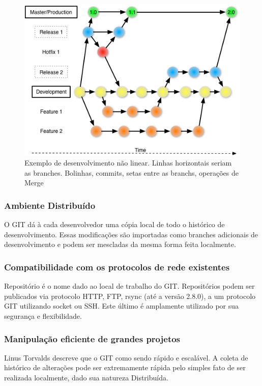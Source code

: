 \documentclass[
	article,			%
	12pt,				%
	oneside,			%
	a4paper,			%
	english,			%
	brazil,				%
	sumario=tradicional
	]{abntex2}
\begin{document}
\begin{figure}[!h]
\centering
\includegraphics[scale=0.5]{images/git_workflow.png}
\caption{Exemplo de desenvolvimento não linear. Linhas horizontais seriam as branches. Bolinhas, commits, setas entre as branchs, operações de Merge}
\label{img_git_workflow}
\end{figure}

\subsubsection{Ambiente Distribuído}

O GIT dá à cada desenvolvedor uma cópia local de todo o histórico de desenvolvimento. Essas modificações são importadas como branches adicionais de desenvolvimento e podem ser mescladas da mesma forma feita localmente.

\subsubsection{Compatibilidade com os protocolos de rede existentes}
Repositório é o nome dado ao local de trabalho do GIT. Repositórios podem ser publicados via protocolo HTTP, FTP, rsync (até a versão 2.8.0), a um protocolo GIT utilizando socket ou SSH. Este último é amplamente utilizado por sua segurança e flexibilidade.

\subsubsection{Manipulação eficiente de grandes projetos}
Linus Torvalds descreve que o GIT como sendo rápido e escalável. A coleta de histórico de alterações pode ser extremamente rápida pelo simples fato de ser realizada localmente, dado sua natureza Distribuída.
\end{document}
